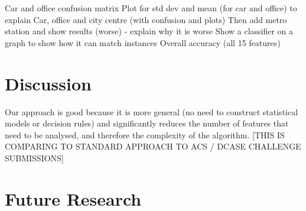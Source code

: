 \documentclass[11pt]{article}
\begin{document}
Car and office confusion matrix
Plot for std dev and mean (for car and office) to explain
Car, office and city centre (with confusion and plots)
Then add metro station and show results (worse) - explain why it is worse
Show a classifier on a graph to show how it can match instances
Overall accuracy (all 15 features)


\section{Discussion}


Our approach is good because it is more general (no need to construct statistical models or decision rules) and significantly reduces the number of features that need to be analysed, and therefore the complexity of the algorithm. [THIS IS COMPARING TO STANDARD APPROACH TO ACS / DCASE CHALLENGE SUBMISSIONS]







\section{Future Research}
\end{document}
